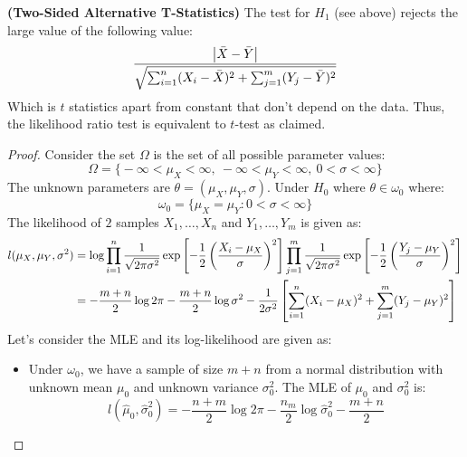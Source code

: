 \begin{proposition}{\textbf{(Two-Sided Alternative T-Statistics)}}
    The test for $H_1$ (see above) rejects the large value of the following value:
    \begin{equation*}
        \frac{\left| \bar{X} - \bar{Y} \right|}{\sqrt{\sum^n_{i=1} (X_i - \bar{X})^2  + \sum^m_{j=1}(Y_j - \bar{Y})^2 }}
    \end{equation*}
    Which is $t$ statistics apart from constant that don't depend on the data. Thus, the likelihood ratio test is equivalent to $t$-test as claimed. 
\end{proposition}
\begin{proof}
    Consider the set $\Omega$ is the set of all possible parameter values:
    \begin{equation*}
        \Omega = \Big\{ -\infty < \mu_X < \infty, \ -\infty < \mu_Y < \infty, \ 0 < \sigma < \infty \Big\}
    \end{equation*}
    The unknown parameters are $\theta = (\mu_X, \mu_Y, \sigma)$. Under $H_0$ where $\theta \in \omega_0$ where:
    \begin{equation*}
        \omega_0 = \Big\{ \mu_X = \mu_Y : 0 < \sigma < \infty \Big\}
    \end{equation*}
    The likelihood of $2$ samples $X_1,\dots,X_n$ and $Y_1,\dots,Y_m$ is given as:
    \begin{equation*}
    \begin{aligned}
        l(\mu_X, \mu_Y, \sigma^2) &= \log\prod^n_{i=1}\frac{1}{\sqrt{2\pi\sigma^2}}\exp\left[ -\frac{1}{2}\left( \frac{X_i - \mu_X}{\sigma} \right)^2 \right] \prod^m_{j=1}\frac{1}{\sqrt{2\pi\sigma^2}}\exp\left[ -\frac{1}{2}\left( \frac{Y_j - \mu_Y}{\sigma} \right)^2 \right] \\
        &= -\frac{m+n}{2}\log 2\pi - \frac{m+n}{2}\log\sigma^2 - \frac{1}{2\sigma^2}\left[ \sum^n_{i=1}(X_i - \mu_X)^2 + \sum^m_{j=1}(Y_j - \mu_Y)^2 \right]
    \end{aligned}
    \end{equation*}
    Let's consider the MLE and its log-likelihood are given as:
    \begin{itemize}
        \item Under $\omega_0$, we have a sample of size $m+n$ from a normal distribution with unknown mean $\mu_0$ and unknown variance $\sigma_0^2$. The MLE of $\mu_0$ and $\sigma^2_0$ is:
        \begin{equation*}
            l(\hat{\mu}_0, \hat{\sigma}^2_0) = -\frac{n+m}{2}\log 2\pi - \frac{n_m}{2}\log\hat{\sigma}^2_0 - \frac{m+n}{2}

\end{equation*}
\end{itemize}
\end{proof}
